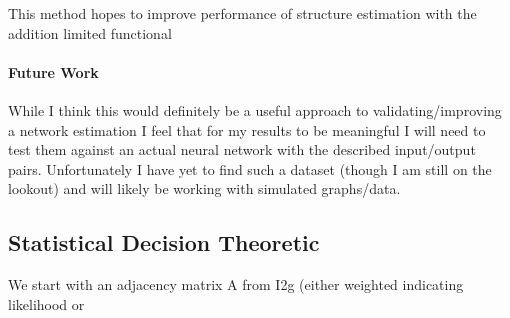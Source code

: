 \documentclass[12pt]{article}
\begin{document}
This method hopes to improve performance of structure estimation with the addition limited functional 

\paragraph{Future Work}

While I think this would definitely be a useful approach to validating/improving a network estimation I feel that for my results to be meaningful I will need to test them against an actual neural network with the described input/output pairs. Unfortunately I have yet to find such a dataset (though I am still on the lookout) and will likely be working with simulated graphs/data.

\pagebreak


\subsection*{Statistical Decision Theoretic}

We start with an adjacency matrix A from I2g (either weighted indicating likelihood or 
\end{document}
